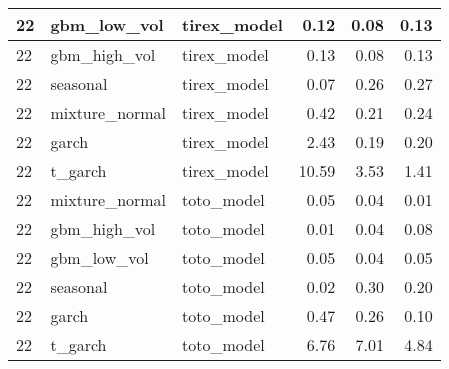 {\begin{tabular}{lllrrr}
\midrule
22 & gbm\_low\_vol & tirex\_model & 0.12 & 0.08 & 0.13 \\
\midrule
22 & gbm\_high\_vol & tirex\_model & 0.13 & 0.08 & 0.13 \\
\midrule
22 & seasonal & tirex\_model & 0.07 & 0.26 & 0.27 \\
\midrule
22 & mixture\_normal & tirex\_model & 0.42 & 0.21 & 0.24 \\
\midrule
22 & garch & tirex\_model & 2.43 & 0.19 & 0.20 \\
\midrule
22 & t\_garch & tirex\_model & 10.59 & 3.53 & 1.41 \\
\midrule
22 & mixture\_normal & toto\_model & 0.05 & 0.04 & 0.01 \\
\midrule
22 & gbm\_high\_vol & toto\_model & 0.01 & 0.04 & 0.08 \\
\midrule
22 & gbm\_low\_vol & toto\_model & 0.05 & 0.04 & 0.05 \\
\midrule
22 & seasonal & toto\_model & 0.02 & 0.30 & 0.20 \\
\midrule
22 & garch & toto\_model & 0.47 & 0.26 & 0.10 \\
\midrule
22 & t\_garch & toto\_model & 6.76 & 7.01 & 4.84 \\
\bottomrule
\end{tabular}
}